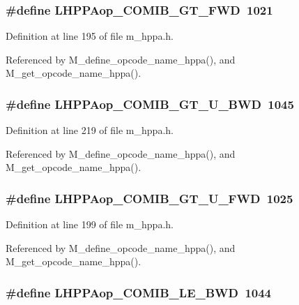 \subsubsection{\setlength{\rightskip}{0pt plus 5cm}\#define LHPPAop\_\-COMIB\_\-GT\_\-FWD~1021}\label{m__hppa_8h_01c4e747efeed95c2dcecf16ef3333c2}




Definition at line 195 of file m\_\-hppa.h.

Referenced by M\_\-define\_\-opcode\_\-name\_\-hppa(), and M\_\-get\_\-opcode\_\-name\_\-hppa().
\subsubsection{\setlength{\rightskip}{0pt plus 5cm}\#define LHPPAop\_\-COMIB\_\-GT\_\-U\_\-BWD~1045}\label{m__hppa_8h_31c1b2971c62eb8648a0e6ed1f2d8ea5}




Definition at line 219 of file m\_\-hppa.h.

Referenced by M\_\-define\_\-opcode\_\-name\_\-hppa(), and M\_\-get\_\-opcode\_\-name\_\-hppa().
\subsubsection{\setlength{\rightskip}{0pt plus 5cm}\#define LHPPAop\_\-COMIB\_\-GT\_\-U\_\-FWD~1025}\label{m__hppa_8h_248cc299dfd1917c02f90fb072d81dfd}




Definition at line 199 of file m\_\-hppa.h.

Referenced by M\_\-define\_\-opcode\_\-name\_\-hppa(), and M\_\-get\_\-opcode\_\-name\_\-hppa().
\subsubsection{\setlength{\rightskip}{0pt plus 5cm}\#define LHPPAop\_\-COMIB\_\-LE\_\-BWD~1044}\label{m__hppa_8h_9debe6afc112cdfa95de8fed354d9aff}





